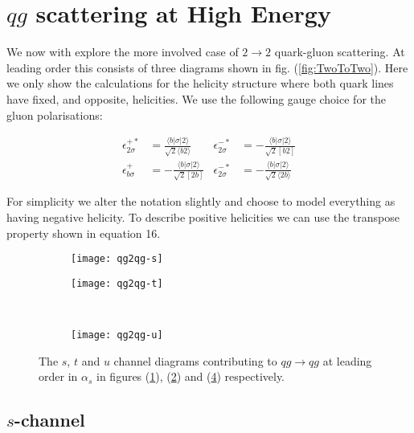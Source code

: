 	\section{$qg$ scattering at High Energy}

		We now with explore the more involved case of $2\rightarrow 2$ quark-gluon scattering.  At leading order this
		consists of three diagrams shown in fig. (\ref{fig:TwoToTwo}).  Here we only show the calculations
		for the helicity structure where both quark lines have fixed, and opposite, helicities.  We use
		the following gauge choice for the gluon polarisations:

		\begin{align}
		\epsilon^{+*}_{2\sigma}&=\frac{\langle b|\sigma|2\rangle}{\sqrt{2}\langle b2\rangle} & \epsilon^{-*}_{2\sigma} &= -\frac{\langle b|\sigma|2\rangle}{\sqrt{2}[b2]} \\
		\epsilon^{+}_{b\sigma}&=-\frac{\langle b|\sigma|2\rangle}{\sqrt{2}[2b]} & \epsilon^{-*}_{2\sigma} &= -\frac{\langle b|\sigma|2\rangle}{\sqrt{2}\langle 2b\rangle}
		\end{align}

		For simplicity we alter the notation slightly and choose to model everything as having negative helicity.
		To describe positive helicities we can use the transpose property shown in equation 16.

		\begin{figure}[h]
			\centering
			\begin{subfigure}[b]{0.3\textwidth}
				\texttt{[image: qg2qg-s]}
				\caption{}
				\label{fig:qg2qg-s}
			\end{subfigure}

			\begin{subfigure}[b]{0.3\textwidth}
				\texttt{[image: qg2qg-t]}
				\caption{}
				\label{fig:qg2qg-t}
			\end{subfigure}
			~
			\begin{subfigure}[b]{0.3\textwidth}
				\texttt{[image: qg2qg-u]}
				\caption{}
				\label{fig:qg2qg-u}
			\end{subfigure}
			\caption{The $s$, $t$ and $u$ channel diagrams contributing to $qg\rightarrow qg$ at leading
			         order in $\alpha_s$ in figures (\ref{fig:qg2qg-s}), (\ref{fig:qg2qg-t}) and (\ref{fig:qg2qg-u})
			         respectively.}
		\end{figure}

		\subsection{$s$-channel}

